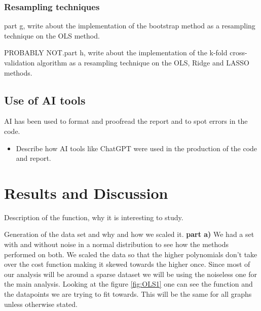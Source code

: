 \documentclass[amssymb,twocolumn,aps]{revtex4}
\begin{document}
\subsubsection{Resampling techniques}
part g, write about the implementation of the bootstrap method as a resampling technique on the OLS method.

PROBABLY NOT.part h, write about the implementation of the k-fold cross-validation algorithm as a resampling technique on the OLS, Ridge and LASSO methods.

\subsection{Use of AI tools}
	AI has been used to format and proofread the report and to spot errors in the code.
\begin{itemize}
    \item Describe how AI tools like ChatGPT were used in the production of the code and report.
\end{itemize}




\section{Results and Discussion}\label{section:results}

Description of the function, why it is interesting to study.



Generation of the data set and why and how we scaled it. \textbf{part a)}
We had a set with and without noise in a normal distribution to see how the methods performed on both.
We scaled the data so that the higher polynomials don't take over the cost function making it skewed towards the higher once.
Since most of our analysis will be around a sparse dataset we will be using the noiseless one for the main analysis.
Looking at the figure \ref{fig:OLS1} one can see the function and the datapoints we are trying to fit towards.
This will be the same for all graphs unless otherwise stated.
\end{document}
